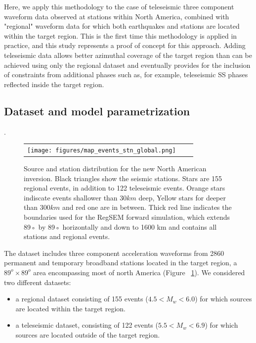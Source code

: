 \documentclass[12pt]{article}
\begin{document}
Here, we apply this methodology to the case of teleseismic three component waveform data observed at stations within North America, combined with "regional" waveform data for which both earthquakes and stations are located within the target region.  This is the first time this methodology is applied in practice, and this study represents a proof of concept for this approach. Adding teleseismic data allows better azimuthal coverage of the target region than can be achieved using only the regional dataset and eventually provides for the inclusion of constraints from additional phases such as, for example, teleseismic SS phases reflected inside the target region.



\subsection{Dataset and model parametrization}.

\begin{figure}[ht]
	\centering
	\begin{tabular}{ccc}
		\texttt{[image: figures/map\_events\_stn\_global.png]}
	\end{tabular}

	\caption{\baselineskip 18pt 
	Source and station distribution for the new North American inversion. Black triangles show the seismic stations. Stars are 155 regional events, in addition to 122 teleseismic events. Orange stars indiscate events shallower than $30km$ deep, Yellow stars for deeper than $300km$ and red one are in between. Thick red line indicates the boundaries used for the RegSEM forward simulation, which extends 89◦ by 89◦ horizontally and down to 1600 km and contains all stations and regional events.}

	\label{map_evt_stn}
\end{figure}

The dataset includes three component acceleration waveforms from 2860 permanent and temporary broadband stations located in the target region, a $89^o \times 89^o $ area encompassing most of north America (Figure ~\ref{map_evt_stn}). We considered two different datasets:
\begin{itemize}
	\item a regional dataset consisting of 155 events ($4.5 < M_w < 6.0$) for which sources are located within the target region.
	\item a teleseismic dataset, consisting of 122 events ($5.5 <M_w <6.9$) for which sources are located outside of the target region.
\end{itemize}
\end{document}
